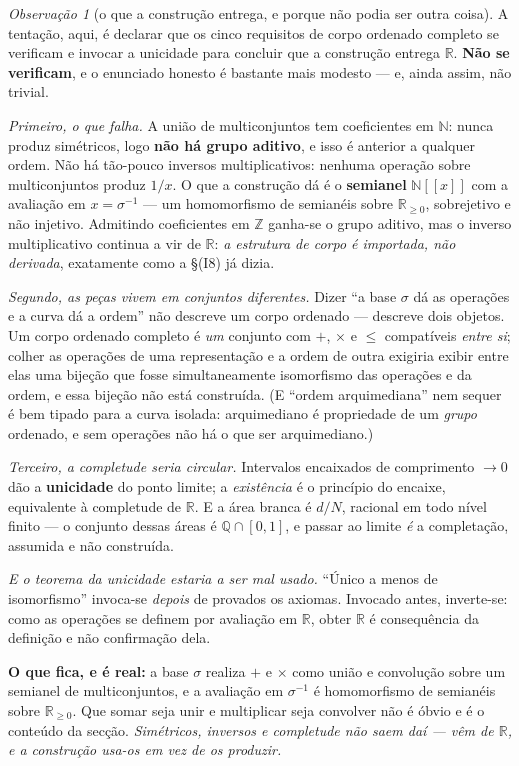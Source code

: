 \documentclass[11pt,a4paper]{article}
\theoremstyle{plain}
\theoremstyle{definition}
\theoremstyle{remark}
\newtheorem{obs}[teorema]{Observação}
\newcommand{\R}{\mathbb{R}}
\newcommand{\Q}{\mathbb{Q}}
\newcommand{\Z}{\mathbb{Z}}
\newcommand{\N}{\mathbb{N}}
\begin{document}
\begin{obs}[o que a construção entrega, e porque não podia ser outra coisa]\label{obs:entrega}
A tentação, aqui, é declarar que os cinco requisitos de corpo ordenado completo se verificam e
invocar a unicidade para concluir que a construção entrega $\R$. \textbf{Não se verificam}, e o
enunciado honesto é bastante mais modesto --- e, ainda assim, não trivial.

\emph{Primeiro, o que falha.} A união de multiconjuntos tem coeficientes em $\N$: nunca produz
simétricos, logo \textbf{não há grupo aditivo}, e isso é anterior a qualquer ordem. Não há tão-pouco
inversos multiplicativos: nenhuma operação sobre multiconjuntos produz $1/x$. O que a construção dá
é o \textbf{semianel} $\N[[x]]$ com a avaliação em $x=\sigma^{-1}$ --- um homomorfismo de semianéis
sobre $\R_{\geq0}$, sobrejetivo e não injetivo. Admitindo coeficientes em $\Z$ ganha-se o grupo
aditivo, mas o inverso multiplicativo continua a vir de $\R$: \emph{a estrutura de corpo é
importada, não derivada}, exatamente como a \S(I8) já dizia.

\emph{Segundo, as peças vivem em conjuntos diferentes.} Dizer ``a base $\sigma$ dá as operações e a
curva dá a ordem'' não descreve um corpo ordenado --- descreve dois objetos. Um corpo ordenado
completo é \emph{um} conjunto com $+$, $\times$ e $\leq$ compatíveis \emph{entre si}; colher as
operações de uma representação e a ordem de outra exigiria exibir entre elas uma bijeção que fosse
simultaneamente isomorfismo das operações e da ordem, e essa bijeção não está construída. (E
``ordem arquimediana'' nem sequer é bem tipado para a curva isolada: arquimediano é propriedade de
um \emph{grupo} ordenado, e sem operações não há o que ser arquimediano.)

\emph{Terceiro, a completude seria circular.} Intervalos encaixados de comprimento $\to0$ dão a
\textbf{unicidade} do ponto limite; a \emph{existência} é o princípio do encaixe, equivalente à
completude de $\R$. E a área branca é $d/N$, racional em todo nível finito --- o conjunto dessas
áreas é $\Q\cap[0,1]$, e passar ao limite \emph{é} a completação, assumida e não construída.

\emph{E o teorema da unicidade estaria a ser mal usado.} ``Único a menos de isomorfismo'' invoca-se
\emph{depois} de provados os axiomas. Invocado antes, inverte-se: como as operações se definem por
avaliação em $\R$, obter $\R$ é consequência da definição e não confirmação dela.

\medskip
\noindent \textbf{O que fica, e é real:} a base $\sigma$ realiza $+$ e $\times$ como união e
convolução sobre um semianel de multiconjuntos, e a avaliação em $\sigma^{-1}$ é homomorfismo de
semianéis sobre $\R_{\geq0}$. Que somar seja unir e multiplicar seja convolver não é óbvio e é o
conteúdo da secção. \emph{Simétricos, inversos e completude não saem daí --- vêm de $\R$, e a
construção usa-os em vez de os produzir.}
\end{obs}
\end{document}
